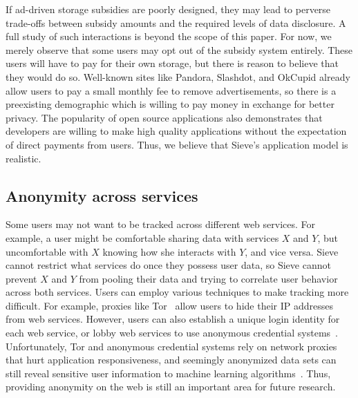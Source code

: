 If ad-driven storage subsidies are poorly
designed, they may lead to perverse trade-offs
between subsidy amounts and the required
levels of data disclosure. A full study of
such interactions is beyond the scope of
this paper. For now, we merely observe that
some users may opt out of the subsidy system
entirely. These users will have to pay for
their own storage, but there is reason to
believe that they would do so. Well-known
sites like Pandora, Slashdot, and OkCupid
already allow users to pay a small monthly
fee to remove advertisements, so there is a
preexisting demographic which is willing to
pay money in exchange for better privacy.
The popularity of open source applications
also demonstrates that developers are willing
to make high quality applications without the
expectation of direct payments from users.
Thus, we believe that Sieve's application
model is realistic.

\subsection{Anonymity across services} Some
users may not want to be tracked across
different web services. For example, a user
might be comfortable sharing data with services
$X$ and $Y$, but uncomfortable with $X$ knowing
how she interacts with $Y$, and vice versa.
Sieve cannot restrict what services do once
they possess user data, so Sieve cannot prevent
$X$ and $Y$ from pooling their data and trying
to correlate user behavior across both services.
Users can employ various techniques to make
tracking more difficult. For example, proxies
like Tor~\cite{tor} allow users to hide their
IP addresses from web services. However, users can also
establish a unique login identity for each web
service, or lobby web services to use anonymous
credential systems~\cite{camenisch2001efficient}. 
Unfortunately, Tor
and anonymous credential systems rely on network
proxies that hurt application responsiveness,
and seemingly anonymized data sets can still
reveal sensitive user information to machine
learning algorithms~\cite{dwork2011differential}. Thus, providing
anonymity on the web is still an important area
for future research.
